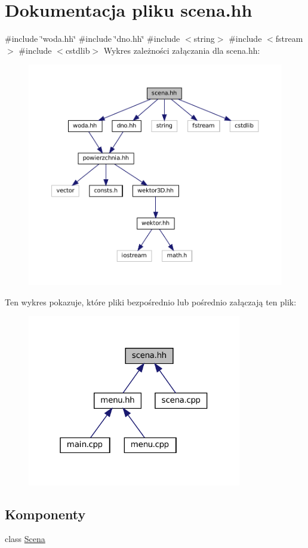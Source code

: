 \hypertarget{scena_8hh}{}\section{Dokumentacja pliku scena.\+hh}
\label{scena_8hh}
{\ttfamily \#include \char`\"{}woda.\+hh\char`\"{}}\newline
{\ttfamily \#include \char`\"{}dno.\+hh\char`\"{}}\newline
{\ttfamily \#include $<$string$>$}\newline
{\ttfamily \#include $<$fstream$>$}\newline
{\ttfamily \#include $<$cstdlib$>$}\newline
Wykres zależności załączania dla scena.\+hh\+:\nopagebreak
\begin{figure}[H]
\begin{center}
\leavevmode
\includegraphics[width=350pt]{scena_8hh__incl}
\end{center}
\end{figure}
Ten wykres pokazuje, które pliki bezpośrednio lub pośrednio załączają ten plik\+:
\nopagebreak
\begin{figure}[H]
\begin{center}
\leavevmode
\includegraphics[width=265pt]{scena_8hh__dep__incl}
\end{center}
\end{figure}
\subsection*{Komponenty}
\begin{DoxyCompactItemize}
\item 
class \mbox{\hyperlink{class_scena}{Scena}}
\end{DoxyCompactItemize}
